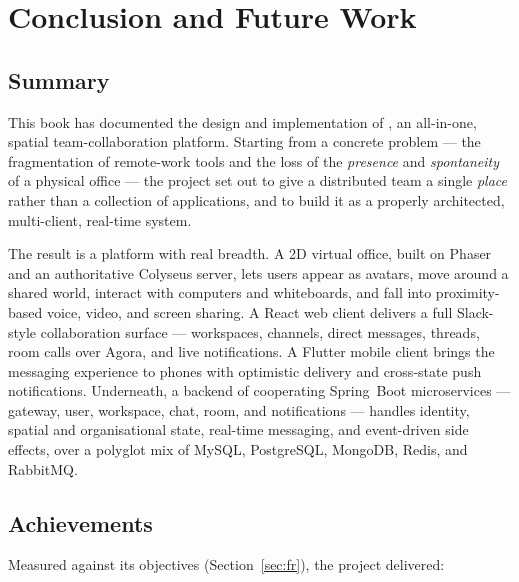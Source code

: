 \chapter{Conclusion and Future Work}
\label{ch:conclusion}

\section{Summary}

This book has documented the design and implementation of \voname{}, an
all-in-one, spatial team-collaboration platform. Starting from a concrete problem
--- the fragmentation of remote-work tools and the loss of the \emph{presence} and
\emph{spontaneity} of a physical office --- the project set out to give a
distributed team a single \emph{place} rather than a collection of applications,
and to build it as a properly architected, multi-client, real-time system.

The result is a platform with real breadth. A 2D virtual office, built on Phaser
and an authoritative Colyseus server, lets users appear as avatars, move around a
shared world, interact with computers and whiteboards, and fall into
proximity-based voice, video, and screen sharing. A React web client delivers a
full Slack-style collaboration surface --- workspaces, channels, direct messages,
threads, room calls over Agora, and live notifications. A Flutter mobile client
brings the messaging experience to phones with optimistic delivery and
cross-state push notifications. Underneath, a backend of cooperating Spring~Boot
microservices --- gateway, user, workspace, chat, room, and notifications ---
handles identity, spatial and organisational state, real-time messaging, and
event-driven side effects, over a polyglot mix of MySQL, PostgreSQL, MongoDB,
Redis, and RabbitMQ.

\section{Achievements}

Measured against its objectives (Section~\ref{sec:fr}), the project delivered:

